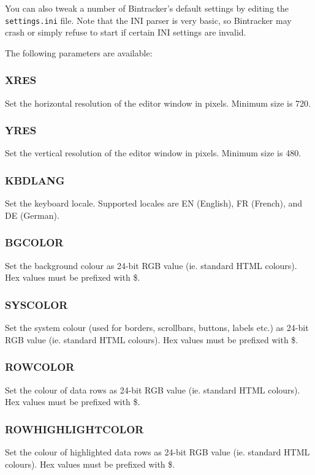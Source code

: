 \documentclass[12pt]{report}	%
\begin{document}
You can also tweak a number of Bintracker's default settings by editing the \texttt{settings.ini} file. Note that the INI parser is very basic, so Bintracker may crash or simply refuse to start if certain INI settings are invalid.

The following parameters are available:

\subsubsection{XRES}
Set the horizontal resolution of the editor window in pixels. Minimum size is 720.

\subsubsection{YRES}
Set the vertical resolution of the editor window in pixels. Minimum size is 480.

\subsubsection{KBDLANG}
Set the keyboard locale. Supported locales are EN (English), FR (French), and DE (German).

\subsubsection{BGCOLOR}
Set the background colour as 24-bit RGB value (ie. standard HTML colours). Hex values must be prefixed with \$.

\subsubsection{SYSCOLOR}
Set the system colour (used for borders, scrollbars, buttons, labels etc.) as 24-bit RGB value (ie. standard HTML colours). Hex values must be prefixed with \$.

\subsubsection{ROWCOLOR}
Set the colour of data rows as 24-bit RGB value (ie. standard HTML colours). Hex values must be prefixed with \$.

\subsubsection{ROWHIGHLIGHTCOLOR}
Set the colour of highlighted data rows as 24-bit RGB value (ie. standard HTML colours). Hex values must be prefixed with \$.
\end{document}
